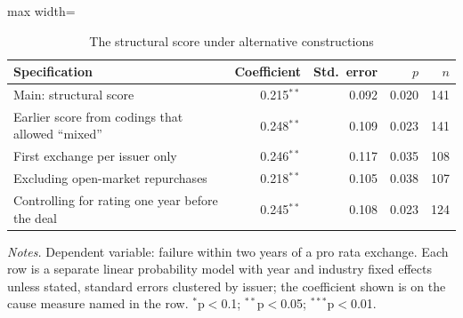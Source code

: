 \begin{table}[H]
\centering
\caption{The structural score under alternative constructions}
\label{tab:robust}
\small
\begin{adjustbox}{max width=\textwidth}
\begin{tabular}{l r r r r}
\toprule
Specification & Coefficient & Std.\ error & $p$ & $n$ \\
\midrule
Main: structural score & 0.215$^{**}$ & 0.092 & 0.020 & 141 \\
\addlinespace
Earlier score from codings that allowed ``mixed'' & 0.248$^{**}$ & 0.109 & 0.023 & 141 \\
\addlinespace
First exchange per issuer only & 0.246$^{**}$ & 0.117 & 0.035 & 108 \\
Excluding open-market repurchases & 0.218$^{**}$ & 0.105 & 0.038 & 107 \\
Controlling for rating one year before the deal & 0.245$^{**}$ & 0.108 & 0.023 & 124 \\
\bottomrule
\end{tabular}
\end{adjustbox}
\begin{minipage}{0.95\textwidth}\vspace{4pt}\footnotesize
\textit{Notes.} Dependent variable: failure within two years of a pro rata exchange. Each row is a separate linear probability model with year and industry fixed effects unless stated, standard errors clustered by issuer; the coefficient shown is on the cause measure named in the row. $^{*}$p$<$0.1; $^{**}$p$<$0.05; $^{***}$p$<$0.01.
\end{minipage}
\end{table}
